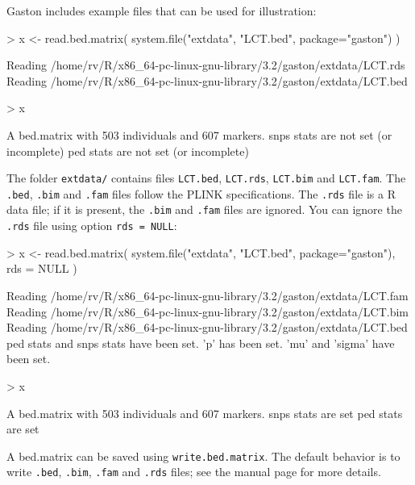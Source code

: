 \documentclass{article}
\renewenvironment{Schunk}{\vspace{\topsep}}{\vspace{\topsep}}
\begin{document}
  Gaston includes example files that can be used for illustration:

\begin{Schunk}
\begin{Sinput}
> x <- read.bed.matrix( system.file("extdata", "LCT.bed", package="gaston") )
\end{Sinput}
\begin{Soutput}
Reading /home/rv/R/x86_64-pc-linux-gnu-library/3.2/gaston/extdata/LCT.rds 
Reading /home/rv/R/x86_64-pc-linux-gnu-library/3.2/gaston/extdata/LCT.bed 
\end{Soutput}
\begin{Sinput}
> x
\end{Sinput}
\begin{Soutput}
A bed.matrix with 503 individuals and 607 markers.
snps stats are not set (or incomplete)
ped stats are not set (or incomplete)
\end{Soutput}
\end{Schunk}
  
  The folder \verb!extdata/! contains files \verb!LCT.bed!, \verb!LCT.rds!,
  \verb!LCT.bim! and \verb!LCT.fam!. The \verb!.bed!, \verb!.bim! and \verb!.fam! files follow the
  PLINK specifications. The \verb!.rds! file is a R data file; if it is present, the
  \verb!.bim! and \verb!.fam! files are ignored. You can ignore the
  \verb!.rds! file using option \verb!rds = NULL!:

\begin{Schunk}
\begin{Sinput}
> x <- read.bed.matrix( system.file("extdata", "LCT.bed", package="gaston"), rds = NULL )
\end{Sinput}
\begin{Soutput}
Reading /home/rv/R/x86_64-pc-linux-gnu-library/3.2/gaston/extdata/LCT.fam 
Reading /home/rv/R/x86_64-pc-linux-gnu-library/3.2/gaston/extdata/LCT.bim 
Reading /home/rv/R/x86_64-pc-linux-gnu-library/3.2/gaston/extdata/LCT.bed 
ped stats and snps stats have been set. 
'p' has been set. 
'mu' and 'sigma' have been set.
\end{Soutput}
\begin{Sinput}
> x
\end{Sinput}
\begin{Soutput}
A bed.matrix with 503 individuals and 607 markers.
snps stats are set
ped stats are set
\end{Soutput}
\end{Schunk}

  A bed.matrix can be saved using \verb!write.bed.matrix!.  
  The default behavior is to write \verb!.bed!, \verb!.bim!, \verb!.fam! 
  and \verb!.rds! files; see the manual page for more details.
\end{document}
